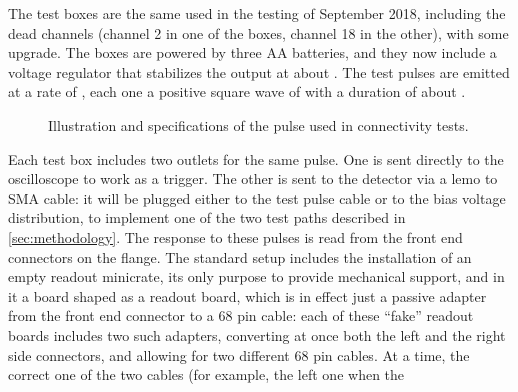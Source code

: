 The test boxes are the same used in the testing of September 2018, including the
dead channels (channel 2 in one of the boxes, channel 18 in the other), with
some upgrade.
The boxes are powered by three  AA batteries, and they now include a
voltage regulator that stabilizes the output at about .
The test pulses are emitted at a rate of , each one a positive square
wave of  with a duration of about .
\begin{figure}
  \caption{
    Illustration and specifications of the pulse used in connectivity tests.
  }
  \label{fig:TestPulse} 
\end{figure}
Each test box includes two outlets for the same pulse.
One is sent directly to the oscilloscope to work as a trigger.
The other is sent to the detector via a lemo to SMA cable: it will be plugged
either to the test pulse cable or to the bias voltage distribution, to implement
one of the two test paths described in \cref{sec:methodology}.
The response to these pulses is read from the front end connectors on the
flange.
The standard setup includes the installation of an empty readout minicrate, its
only purpose to provide mechanical support, and in it a board shaped as a
readout board, which is in effect just a passive adapter from the front end
connector to a 68 pin cable: each of these ``fake'' readout boards includes two
such adapters, converting at once both the left and the right side connectors,
and allowing for two different 68 pin cables.
At a time, the correct one of the two cables (for example, the left one when the
